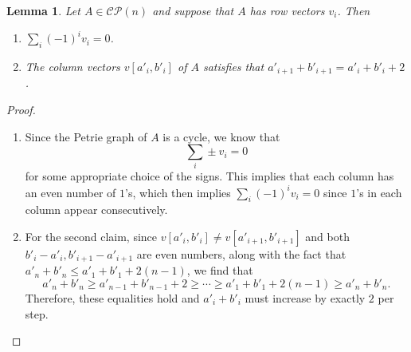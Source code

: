 \documentclass[pdflatex,sn-mathphys-num]{sn-jnl}%
\theoremstyle{thmstyleone}%
\newtheorem{lemma}[theorem]{Lemma}
\theoremstyle{thmstyletwo}%
\theoremstyle{thmstylethree}%
\numberwithin{equation}{section}
\begin{document}
        \begin{lemma}\label{lemma:cycleCaseLemma}
            Let $A\in \mathcal{CP}(n)$ and suppose that $A$ has row vectors $v_i$. Then 
            \begin{enumerate}
                \item $\sum_i (-1)^i v_i=0$.
                \item The column vectors $v[a'_i,b'_i]$ of $A$ satisfies that $a'_{i+1}+b'_{i+1}=a'_{i}+b'_{i}+2$.
            \end{enumerate}
        \end{lemma}
        \begin{proof}\mbox{}\\
        \begin{enumerate}
            \item 
            Since the Petrie graph of $A$ is a cycle, we know that
            \[\sum_i \pm v_i=0\]
            for some appropriate choice of the signs. This implies that each column has an even number of $1$'s, which then implies $\sum_i (-1)^i v_i=0$ since $1$'s in each column appear consecutively.

            \item 
            For the second claim, since $v[a'_i,b'_i]\neq v[a'_{i+1},b'_{i+1}]$ and both $b'_i-a'_i, b'_{i+1}-a'_{i+1}$ are even numbers, along with the fact that $a'_n+b'_n\leq a'_1+b'_1 +2(n-1)$, we find that
            \[a'_n+b'_n\geq a'_{n-1}+b'_{n-1}+2\geq \cdots\geq a'_1+b'_1+2(n-1)\geq a'_n+b'_n.\]
            Therefore, these equalities hold and  $a'_i+b'_i$ must increase by exactly $2$ per step.
        \end{enumerate}
        \end{proof}
\end{document}
